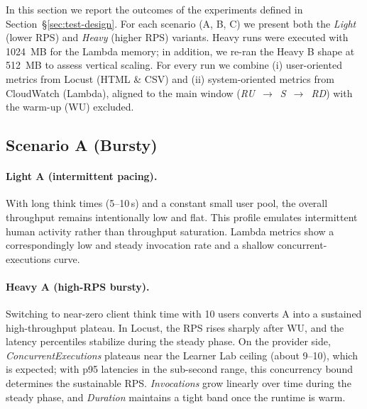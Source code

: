 \documentclass[11pt,a4paper]{article}
\begin{document}
In this section we report the outcomes of the experiments defined in Section~\S\ref{sec:test-design}. For each scenario (A, B, C) we present both the \emph{Light} (lower RPS) and \emph{Heavy} (higher RPS) variants. Heavy runs were executed with \SI{1024}{MB} for the Lambda memory; in addition, we re-ran the Heavy B shape at \SI{512}{MB} to assess vertical scaling. For every run we combine (i) user-oriented metrics from Locust (HTML \& CSV) and (ii) system-oriented metrics from CloudWatch (Lambda), aligned to the main window (\emph{RU}~$\rightarrow$~\emph{S}~$\rightarrow$~\emph{RD}) with the warm-up (WU) excluded.

\subsection{Scenario A (Bursty)}\label{subsec:resA}

\paragraph{Light A (intermittent pacing).}
With long think times (5--10\,s) and a constant small user pool, the overall throughput remains intentionally low and flat. This profile emulates intermittent human activity rather than throughput saturation. Lambda metrics show a correspondingly low and steady invocation rate and a shallow concurrent-executions curve.



\paragraph{Heavy A (high-RPS bursty).}
Switching to near-zero client think time with 10 users converts A into a sustained high-throughput plateau. In Locust, the RPS rises sharply after WU, and the latency percentiles stabilize during the steady phase. On the provider side, \emph{ConcurrentExecutions} plateaus near the Learner Lab ceiling (about 9--10), which is expected; with p95 latencies in the sub-second range, this concurrency bound determines the sustainable RPS. \emph{Invocations} grow linearly over time during the steady phase, and \emph{Duration} maintains a tight band once the runtime is warm.
\end{document}
